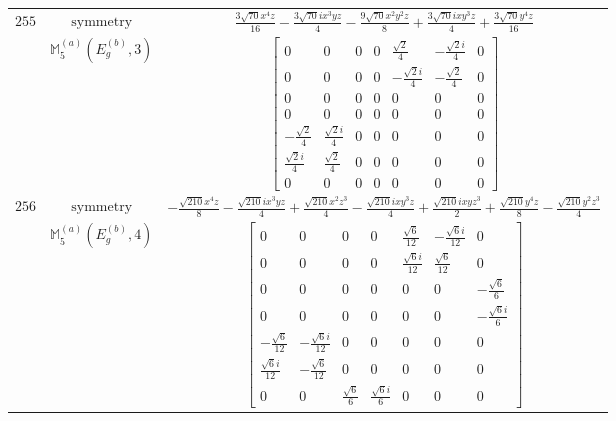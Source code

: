 \documentclass[fleqn,8pt,landscape]{jsarticle}
\begin{document}
\begin{longtable}{ccc}
$ 255 $ & $ \text{symmetry} $ & $ \frac{3 \sqrt{70} x^{4} z}{16} - \frac{3 \sqrt{70} i x^{3} y z}{4} - \frac{9 \sqrt{70} x^{2} y^{2} z}{8} + \frac{3 \sqrt{70} i x y^{3} z}{4} + \frac{3 \sqrt{70} y^{4} z}{16} $ \\
$  $ & $ \mathbb{M}_{5}^{(a)}(E_{g}^{(b)},3) $ & $ \begin{bmatrix} 0 & 0 & 0 & 0 & \frac{\sqrt{2}}{4} & - \frac{\sqrt{2} i}{4} & 0 \\ 0 & 0 & 0 & 0 & - \frac{\sqrt{2} i}{4} & - \frac{\sqrt{2}}{4} & 0 \\ 0 & 0 & 0 & 0 & 0 & 0 & 0 \\ 0 & 0 & 0 & 0 & 0 & 0 & 0 \\ - \frac{\sqrt{2}}{4} & \frac{\sqrt{2} i}{4} & 0 & 0 & 0 & 0 & 0 \\ \frac{\sqrt{2} i}{4} & \frac{\sqrt{2}}{4} & 0 & 0 & 0 & 0 & 0 \\ 0 & 0 & 0 & 0 & 0 & 0 & 0 \end{bmatrix} $ \\ \hline
$ 256 $ & $ \text{symmetry} $ & $ - \frac{\sqrt{210} x^{4} z}{8} - \frac{\sqrt{210} i x^{3} y z}{4} + \frac{\sqrt{210} x^{2} z^{3}}{4} - \frac{\sqrt{210} i x y^{3} z}{4} + \frac{\sqrt{210} i x y z^{3}}{2} + \frac{\sqrt{210} y^{4} z}{8} - \frac{\sqrt{210} y^{2} z^{3}}{4} $ \\
$  $ & $ \mathbb{M}_{5}^{(a)}(E_{g}^{(b)},4) $ & $ \begin{bmatrix} 0 & 0 & 0 & 0 & \frac{\sqrt{6}}{12} & - \frac{\sqrt{6} i}{12} & 0 \\ 0 & 0 & 0 & 0 & \frac{\sqrt{6} i}{12} & \frac{\sqrt{6}}{12} & 0 \\ 0 & 0 & 0 & 0 & 0 & 0 & - \frac{\sqrt{6}}{6} \\ 0 & 0 & 0 & 0 & 0 & 0 & - \frac{\sqrt{6} i}{6} \\ - \frac{\sqrt{6}}{12} & - \frac{\sqrt{6} i}{12} & 0 & 0 & 0 & 0 & 0 \\ \frac{\sqrt{6} i}{12} & - \frac{\sqrt{6}}{12} & 0 & 0 & 0 & 0 & 0 \\ 0 & 0 & \frac{\sqrt{6}}{6} & \frac{\sqrt{6} i}{6} & 0 & 0 & 0 \end{bmatrix} $ \\ \hline
\end{longtable}
\end{document}
